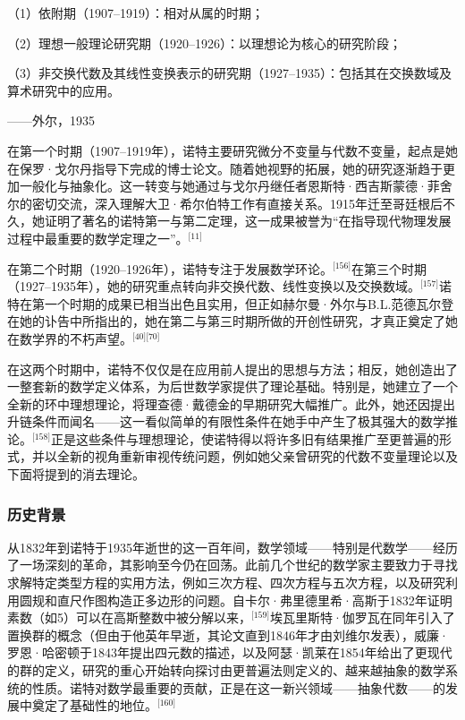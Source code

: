 （1）依附期（1907–1919）：相对从属的时期；

（2）理想一般理论研究期（1920–1926）：以理想论为核心的研究阶段；

（3）非交换代数及其线性变换表示的研究期（1927–1935）：包括其在交换数域及算术研究中的应用。

——外尔，1935

在第一个时期（1907–1919年），诺特主要研究微分不变量与代数不变量，起点是她在保罗·戈尔丹指导下完成的博士论文。随着她视野的拓展，她的研究逐渐趋于更加一般化与抽象化。这一转变与她通过与戈尔丹继任者恩斯特·西吉斯蒙德·菲舍尔的密切交流，深入理解大卫·希尔伯特工作有直接关系。1915年迁至哥廷根后不久，她证明了著名的诺特第一与第二定理，这一成果被誉为“在指导现代物理发展过程中最重要的数学定理之一”。\(^\text{[11]}\)

在第二个时期（1920–1926年），诺特专注于发展数学环论。\(^\text{[156]}\)在第三个时期（1927–1935年），她的研究重点转向非交换代数、线性变换以及交换数域。\(^\text{[157]}\)诺特在第一个时期的成果已相当出色且实用，但正如赫尔曼·外尔与B.L.范德瓦尔登在她的讣告中所指出的，她在第二与第三时期所做的开创性研究，才真正奠定了她在数学界的不朽声望。\(^\text{[40][70]}\)

在这两个时期中，诺特不仅仅是在应用前人提出的思想与方法；相反，她创造出了一整套新的数学定义体系，为后世数学家提供了理论基础。特别是，她建立了一个全新的环中理想理论，将理查德·戴德金的早期研究大幅推广。此外，她还因提出升链条件而闻名——这一看似简单的有限性条件在她手中产生了极其强大的数学推论。\(^\text{[158]}\)正是这些条件与理想理论，使诺特得以将许多旧有结果推广至更普遍的形式，并以全新的视角重新审视传统问题，例如她父亲曾研究的代数不变量理论以及下面将提到的消去理论。
\subsubsection{历史背景}
从1832年到诺特于1935年逝世的这一百年间，数学领域——特别是代数学——经历了一场深刻的革命，其影响至今仍在回荡。此前几个世纪的数学家主要致力于寻找求解特定类型方程的实用方法，例如三次方程、四次方程与五次方程，以及研究利用圆规和直尺作图构造正多边形的问题。自卡尔·弗里德里希·高斯于1832年证明素数（如5）可以在高斯整数中被分解以来，\(^\text{[159]}\)埃瓦里斯特·伽罗瓦在同年引入了置换群的概念（但由于他英年早逝，其论文直到1846年才由刘维尔发表），威廉·罗恩·哈密顿于1843年提出四元数的描述，以及阿瑟·凯莱在1854年给出了更现代的群的定义，研究的重心开始转向探讨由更普遍法则定义的、越来越抽象的数学系统的性质。诺特对数学最重要的贡献，正是在这一新兴领域——抽象代数——的发展中奠定了基础性的地位。\(^\text{[160]}\)
